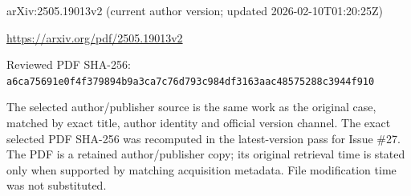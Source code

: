 \documentclass[11pt]{article}
\begin{document}
arXiv:2505.19013v2 (current author version; updated 2026-02-10T01:20:25Z)

\url{https://arxiv.org/pdf/2505.19013v2}

Reviewed PDF SHA-256: \nolinkurl{a6ca75691e0f4f379894b9a3ca7c76d793c984df3163aac48575288c3944f910}

The selected author/publisher source is the same work as the original case, matched by exact title, author identity and official version channel. The exact selected PDF SHA-256 was recomputed in the latest-version pass for Issue \#27. The PDF is a retained author/publisher copy; its original retrieval time is stated only when supported by matching acquisition metadata. File modification time was not substituted.
\end{document}

